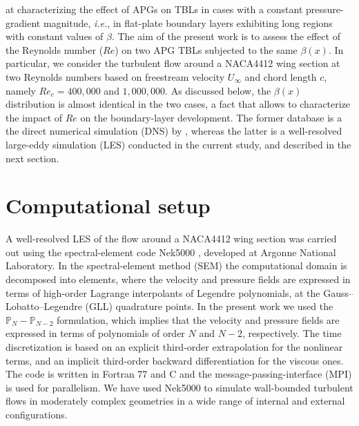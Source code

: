 at characterizing the effect of APGs on TBLs in cases with a constant pressure-gradient magnitude, {\it i.e.}, in flat-plate boundary layers exhibiting long regions with constant values of $\beta$.  The aim of the present work is to assess the effect of the Reynolds number ($Re$) on two APG TBLs subjected to the same $\beta(x)$. In particular, we consider the turbulent flow around a NACA4412 wing section at two Reynolds numbers based on freestream velocity $U_{\infty}$ and chord length $c$, namely $Re_{c}=400,000$ and $1,000,000$. As discussed below, the $\beta(x)$ distribution is almost identical in the two cases, a fact that allows to characterize the impact of $Re$ on the boundary-layer development. The former database is a the direct numerical simulation (DNS) by \cite{hosseini_et_al}, whereas the latter is a well-resolved large-eddy simulation (LES) conducted in the current study, and described in the next section.

\section{Computational setup}

A well-resolved LES of the flow around a NACA4412 wing section was carried out using the spectral-element code Nek5000 \citep{fischer_et_al}, developed at Argonne National Laboratory. In the spectral-element method (SEM) the computational domain is decomposed into elements, where the velocity and pressure fields are expressed in terms of high-order Lagrange interpolants of Legendre polynomials, at the Gauss--Lobatto--Legendre (GLL) quadrature points. In the present work we used the $\mathbb{P}_{N}-\mathbb{P}_{N-2}$ formulation, which implies that the velocity and pressure fields are expressed in terms of polynomials of order $N$ and $N-2$, respectively. The time discretization is based on an explicit third-order extrapolation for the nonlinear terms, and an implicit third-order backward differentiation for the viscous ones. The code is written in Fortran 77 and C and the message-passing-interface (MPI) is used for parallelism. We have used Nek5000 to simulate wall-bounded turbulent flows in moderately complex geometries in a wide range of internal \citep{marin_et_al} and external \citep{skyscraper} configurations.


